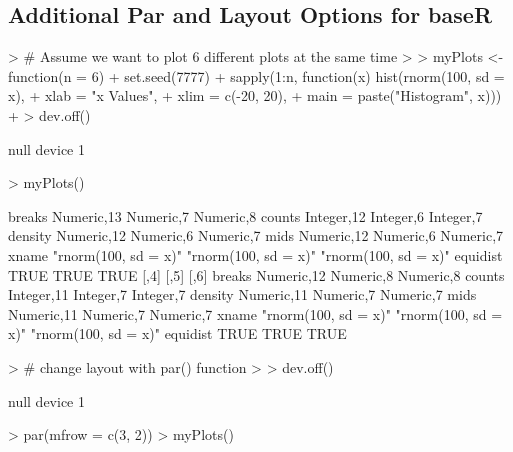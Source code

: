 \documentclass[12pt,letterpaper,final]{article}
\begin{document}
\subsection{Additional Par and Layout Options for baseR}


\begin{Schunk}
\begin{Sinput}
> # Assume we want to plot 6 different plots at the same time
> 
> myPlots <- function(n = 6) {
+   set.seed(7777)
+   sapply(1:n, function(x) hist(rnorm(100, sd = x),
+                                xlab = "x Values",
+                                xlim = c(-20, 20),
+                                main = paste("Histogram", x)))
+ }
> dev.off()
\end{Sinput}
\begin{Soutput}
null device 
          1 
\end{Soutput}
\begin{Sinput}
> myPlots()
\end{Sinput}
\begin{Soutput}
         [,1]                 [,2]                 [,3]                
breaks   Numeric,13           Numeric,7            Numeric,8           
counts   Integer,12           Integer,6            Integer,7           
density  Numeric,12           Numeric,6            Numeric,7           
mids     Numeric,12           Numeric,6            Numeric,7           
xname    "rnorm(100, sd = x)" "rnorm(100, sd = x)" "rnorm(100, sd = x)"
equidist TRUE                 TRUE                 TRUE                
         [,4]                 [,5]                 [,6]                
breaks   Numeric,12           Numeric,8            Numeric,8           
counts   Integer,11           Integer,7            Integer,7           
density  Numeric,11           Numeric,7            Numeric,7           
mids     Numeric,11           Numeric,7            Numeric,7           
xname    "rnorm(100, sd = x)" "rnorm(100, sd = x)" "rnorm(100, sd = x)"
equidist TRUE                 TRUE                 TRUE                
\end{Soutput}
\begin{Sinput}
> # change layout with par() function
> 
> dev.off()
\end{Sinput}
\begin{Soutput}
null device 
          1 
\end{Soutput}
\begin{Sinput}
> par(mfrow = c(3, 2))
> myPlots()
\end{Sinput}
\begin{Soutput}

\end{Soutput}
\end{Schunk}
\end{document}
